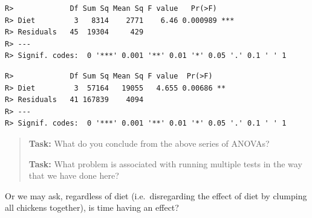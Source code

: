 \documentclass[english,10pt,a4paper,oneside]{book}
\newenvironment{Shaded}{\begin{snugshade}}{\end{snugshade}}
\newcommand{\DataTypeTok}[1]{\textcolor[rgb]{0.13,0.29,0.53}{#1}}
\newcommand{\DecValTok}[1]{\textcolor[rgb]{0.00,0.00,0.81}{#1}}
\newcommand{\KeywordTok}[1]{\textcolor[rgb]{0.13,0.29,0.53}{\textbf{#1}}}
\newcommand{\NormalTok}[1]{#1}
\newcommand{\OperatorTok}[1]{\textcolor[rgb]{0.81,0.36,0.00}{\textbf{#1}}}
\newcommand{\StringTok}[1]{\textcolor[rgb]{0.31,0.60,0.02}{#1}}
\theoremstyle{definition}
\theoremstyle{definition}
\theoremstyle{definition}
\theoremstyle{remark}
\begin{document}
\begin{Shaded}
\end{Shaded}

\begin{verbatim}
R>             Df Sum Sq Mean Sq F value   Pr(>F)    
R> Diet         3   8314    2771    6.46 0.000989 ***
R> Residuals   45  19304     429                     
R> ---
R> Signif. codes:  0 '***' 0.001 '**' 0.01 '*' 0.05 '.' 0.1 ' ' 1
\end{verbatim}

\begin{Shaded}
\end{Shaded}

\begin{verbatim}
R>             Df Sum Sq Mean Sq F value  Pr(>F)   
R> Diet         3  57164   19055   4.655 0.00686 **
R> Residuals   41 167839    4094                   
R> ---
R> Signif. codes:  0 '***' 0.001 '**' 0.01 '*' 0.05 '.' 0.1 ' ' 1
\end{verbatim}

\begin{quote}
\textbf{Task:} What do you conclude from the above series of ANOVAs?

\textbf{Task:} What problem is associated with running multiple tests in
the way that we have done here?
\end{quote}

Or we may ask, regardless of diet (i.e.~disregarding the effect of diet
by clumping all chickens together), is time having an effect?

\begin{Shaded}
\end{Shaded}
\end{document}
